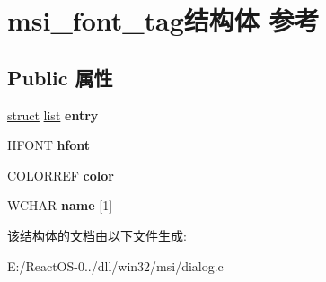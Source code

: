 \hypertarget{structmsi__font__tag}{}\section{msi\+\_\+font\+\_\+tag结构体 参考}
\label{structmsi__font__tag}
\subsection*{Public 属性}
\begin{DoxyCompactItemize}
\item 
\mbox{\label{structmsi__font__tag_aa6184ffc673097ab1237ad48052bd5db}} 
\hyperlink{interfacestruct}{struct} \hyperlink{classlist}{list} {\bfseries entry}
\item 
\mbox{\label{structmsi__font__tag_aee434c937cf66564e873ad125efb6921}} 
H\+F\+O\+NT {\bfseries hfont}
\item 
\mbox{\label{structmsi__font__tag_a88eb55888219903664f0c80c66b619fa}} 
C\+O\+L\+O\+R\+R\+EF {\bfseries color}
\item 
\mbox{\label{structmsi__font__tag_a62f0fa90ea3a44a9d07a69624ac43212}} 
W\+C\+H\+AR {\bfseries name} \mbox{[}1\mbox{]}
\end{DoxyCompactItemize}


该结构体的文档由以下文件生成\+:\begin{DoxyCompactItemize}
\item 
E\+:/\+React\+O\+S-\/0../dll/win32/msi/dialog.\+c\end{DoxyCompactItemize}
